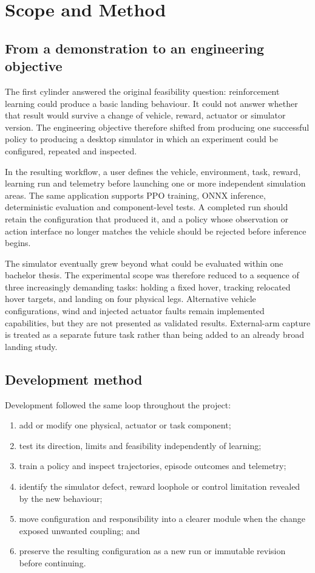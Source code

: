 \chapter{Scope and Method}
\label{ch:scope}

\section{From a demonstration to an engineering objective}

The first cylinder answered the original feasibility question: reinforcement learning could
produce a basic landing behaviour. It could not answer whether that result would survive a
change of vehicle, reward, actuator or simulator version. The engineering objective therefore
shifted from producing one successful policy to producing a desktop simulator in which an
experiment could be configured, repeated and inspected.

In the resulting workflow, a user defines the vehicle, environment, task, reward, learning run
and telemetry before launching one or more independent simulation areas. The same application
supports PPO training, ONNX inference, deterministic evaluation and component-level tests. A
completed run should retain the configuration that produced it, and a policy whose observation
or action interface no longer matches the vehicle should be rejected before inference begins.

The simulator eventually grew beyond what could be evaluated within one bachelor thesis. The
experimental scope was therefore reduced to a sequence of three increasingly demanding tasks:
holding a fixed hover, tracking relocated hover targets, and landing on four physical legs.
Alternative vehicle configurations, wind and injected actuator faults remain implemented
capabilities, but they are not presented as validated results. External-arm capture is treated
as a separate future task rather than being added to an already broad landing study.

\section{Development method}

Development followed the same loop throughout the project:

\begin{enumerate}
  \item add or modify one physical, actuator or task component;
  \item test its direction, limits and feasibility independently of learning;
  \item train a policy and inspect trajectories, episode outcomes and telemetry;
  \item identify the simulator defect, reward loophole or control limitation revealed by the
  new behaviour;
  \item move configuration and responsibility into a clearer module when the change exposed
  unwanted coupling; and
  \item preserve the resulting configuration as a new run or immutable revision before
  continuing.
\end{enumerate}

